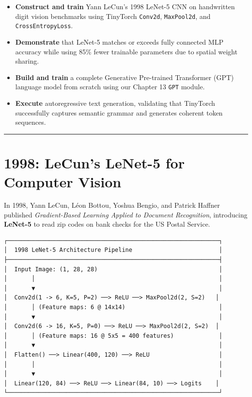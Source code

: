 \documentclass[
  letterpaper,
]{scrbook}
\providecommand{\tightlist}{%
  \setlength{\itemsep}{0pt}\setlength{\parskip}{0pt}}
\begin{document}

\begin{itemize}
\tightlist
\item
  \textbf{Construct and train} Yann LeCun's 1998 LeNet-5 CNN on
  handwritten digit vision benchmarks using TinyTorch \texttt{Conv2d},
  \texttt{MaxPool2d}, and \texttt{CrossEntropyLoss}.
\item
  \textbf{Demonstrate} that LeNet-5 matches or exceeds fully connected
  MLP accuracy while using 85\% fewer trainable parameters due to
  spatial weight sharing.
\item
  \textbf{Build and train} a complete Generative Pre-trained Transformer
  (GPT) language model from scratch using our Chapter 13 \texttt{GPT}
  module.
\item
  \textbf{Execute} autoregressive text generation, validating that
  TinyTorch successfully captures semantic grammar and generates
  coherent token sequences.
\end{itemize}

\begin{center}\rule{0.5\linewidth}{0.5pt}\end{center}

\section*{1998: LeCun's LeNet-5 for Computer
Vision}\label{lecuns-lenet-5-for-computer-vision}


In 1998, Yann LeCun, Léon Bottou, Yoshua Bengio, and Patrick Haffner
published \emph{Gradient-Based Learning Applied to Document
Recognition}, introducing \textbf{LeNet-5} to read zip codes on bank
checks for the US Postal Service.

\begin{verbatim}
┌─────────────────────────────────────────────────────────────┐
│  1998 LeNet-5 Architecture Pipeline                         │
├─────────────────────────────────────────────────────────────┤
│  Input Image: (1, 28, 28)                                   │
│       │                                                     │
│       ▼                                                     │
│  Conv2d(1 -> 6, K=5, P=2) ──> ReLU ──> MaxPool2d(2, S=2)   │
│       │ (Feature maps: 6 @ 14x14)                           │
│       ▼                                                     │
│  Conv2d(6 -> 16, K=5, P=0) ──> ReLU ──> MaxPool2d(2, S=2)  │
│       │ (Feature maps: 16 @ 5x5 = 400 features)             │
│       ▼                                                     │
│  Flatten() ──> Linear(400, 120) ──> ReLU                    │
│       │                                                     │
│       ▼                                                     │
│  Linear(120, 84) ──> ReLU ──> Linear(84, 10) ──> Logits    │
└─────────────────────────────────────────────────────────────┘
\end{verbatim}
\end{document}
